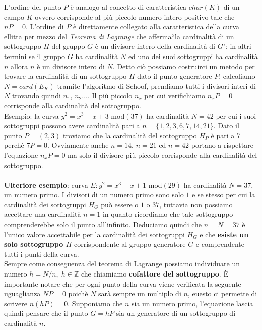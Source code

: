 \documentclass[a4paper,12pt]{tesiinfo}
\begin{document}
L'ordine del punto $P$ \`e analogo al concetto di caratteristica $char(K)$ di un campo $K$ ovvero corrisponde al pi\`u piccolo numero intero positivo tale che $nP = 0$. L'ordine di $P$ \`e direttamente collegato alla caratteristica della curva ellitta per mezzo del \textit{Teorema di Lagrange} che afferma``la cardinalit\`a di un sottogruppo $H$ del gruppo $G$ \`e un divisore intero della cardinalit\`a di $G$"; in altri termini se il gruppo $G$ ha cardinalit\`a $N$ ed uno dei suoi sottogruppi ha cardinalit\`a $n$ allora $n$ \`e un divisore intero di $N$. Detto ci\`o possiamo costruirci un metodo per trovare la cardinalit\`a di un sottogruppo $H$ dato il punto generatore $P$: calcoliamo $N = card(E_K)$ tramite l'algoritmo di Schoof, prendiamo tutti i divisori interi di $N$ trovando quindi $n_1$, $n_2 \ldots$. Il pi\`u piccolo $n_x$ per cui verifichiamo $n_xP = 0$ corrisponde alla cardinalit\`a del sottogruppo.
\\
Esempio: la curva $y^2 = x^3-x+3$ mod$(37)$ ha cardinalit\`a $N=42$ per cui i suoi sottogruppi possono avere cardinalit\`a pari a $n= \{1, 2, 3, 6, 7, 14, 21\}$. Dato il punto $P=(2, 3)$ troviamo che la cardinalit\`a del sottogruppo $H_P$ \`e pari a 7 perch\`e $7P = 0$. Ovviamente anche $n = 14$, $n = 21$ ed $n=42$ portano a rispettare l'equazione $n_xP=0$ ma solo il divisore pi\`u piccolo corrisponde alla cardinalit\`a del sottogruppo.
\\
\\
\textbf{Ulteriore esempio}: curva $E: y^2 = x^3 -x+1$ mod$(29)$ ha cardinalit\`a $N=37$, un numero primo. I divisori di un numero primo sono solo $1$ e se stesso per cui la cardinalit\`a dei sottogruppi $H_G$ pu\`o essere o $1$ o $37$, tuttavia non possiamo accettare una cardinalit\`a $n=1$ in quanto ricordiamo che tale sottogruppo comprenderebbe solo il punto all'infinito. Deduciamo quindi che $n = N = 37$ \`e l'unico valore accettabile per la cardinalit\`a dei sottogruppi $H_G$ e che \textbf{esiste un solo sottogruppo $H$} corrispondente al gruppo generatore $G$ e comprendente tutti i punti della curva.
\\
Sempre come conseguenza del teorema di Lagrange possiamo individuare un numero $h= N \big / n, \mid h \in \mathbb{Z}$ che chiamiamo \textbf{cofattore del sottogruppo}. \`E importante notare che per ogni punto della curva viene verificata la seguente uguaglianza $NP=0$ poich\`e $N$ sar\`a sempre un multiplo di $n$, euesto ci permette di scrivere $n(hP)=0$. Supponiamo che $n$ sia un numero primo, l'equazione lascia quindi pensare che il punto $G = hP$ sia un generatore di un sottogruppo di cardinalit\`a $n$.
\end{document}

